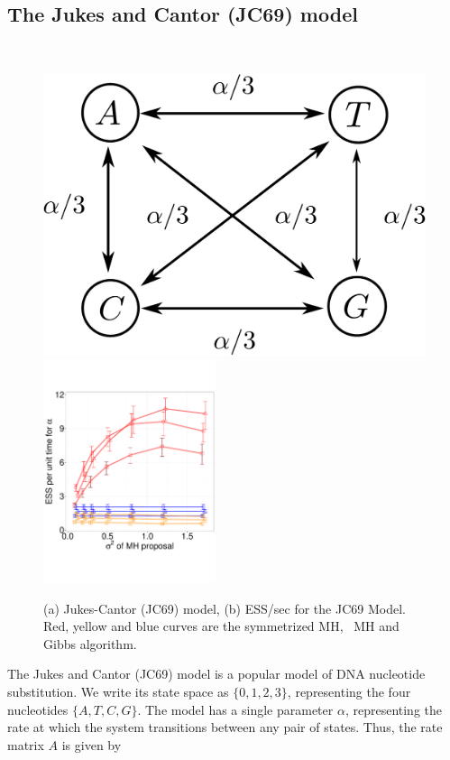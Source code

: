 {  \subsection{The Jukes and Cantor (JC69) model}~
  \begin{figure}%
  \centering
  \begin{minipage}[!hp]{0.7\linewidth}
  \centering
    \includegraphics[width=.45\textwidth, angle=0]{figs/jc_model.pdf}
    \includegraphics[width=0.45\textwidth, angle=0]{figs/jc.pdf}
     \label{fig:ESS_JC}
  \end{minipage}
  \begin{minipage}[!hp]{0.28\linewidth}
  \caption{(a) Jukes-Cantor (JC69) model, (b)
    ESS/sec for the JC69 Model. Red, yellow and blue curves are the 
      symmetrized MH, \naive\ MH and Gibbs algorithm. }
  \end{minipage}
  \end{figure}
  The Jukes and Cantor (JC69) model is a popular model of DNA nucleotide
  substitution.  We write its state space as $\{0, 1, 2, 3\}$, representing the 
  four nucleotides $\{A, T, C, G\}$.  The model has a single parameter $\alpha$, 
  representing the rate at which the system transitions between any pair of 
  states. Thus, the rate matrix $A$ is given by 
}

